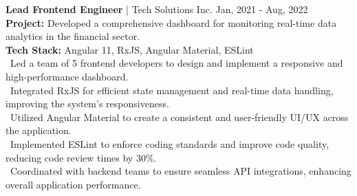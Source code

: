{\textbf{Lead Frontend Engineer} | Tech Solutions Inc. \hfill Jan, 2021 - Aug, 2022} \\
\textbf{Project:} Developed a comprehensive dashboard for monitoring real-time data analytics in the financial sector. \\
\textbf{Tech Stack:} Angular 11, RxJS, Angular Material, ESLint \\
\hspace*{4pt} \textbullet~Led a team of 5 frontend developers to design and implement a responsive and high-performance dashboard. \\
\hspace*{4pt} \textbullet~Integrated RxJS for efficient state management and real-time data handling, improving the system's responsiveness. \\
\hspace*{4pt} \textbullet~Utilized Angular Material to create a consistent and user-friendly UI/UX across the application. \\
\hspace*{4pt} \textbullet~Implemented ESLint to enforce coding standards and improve code quality, reducing code review times by 30\%. \\
\hspace*{4pt} \textbullet~Coordinated with backend teams to ensure seamless API integrations, enhancing overall application performance. \\[4pt]
